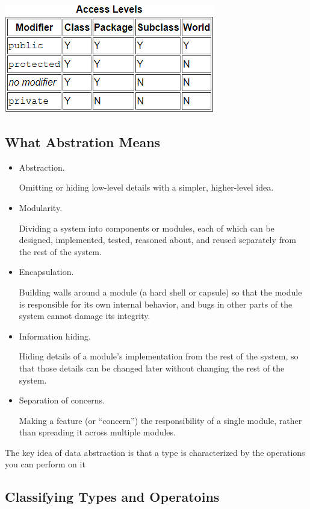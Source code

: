\documentclass[letterpaper,12pt]{article}
\begin{document}
\includegraphics*{./summary_image/Access level control.png}

\subsection{What Abstration Means}

\begin{itemize}
      \item Abstraction.

            Omitting or hiding low-level details with a simpler, higher-level idea.
      \item Modularity.

            Dividing a system into components or modules, each of which can be designed,
            implemented, tested, reasoned about, and reused separately from the rest of the
            system.
      \item Encapsulation.

            Building walls around a module (a hard shell or capsule) so that the module is
            responsible for its own internal behavior, and bugs in other parts of the
            system cannot damage its integrity.
      \item Information hiding.

            Hiding details of a module's implementation from the rest of the system, so
            that those details can be changed later without changing the rest of the
            system.
      \item Separation of concerns.

            Making a feature (or ``concern'') the responsibility of a single module, rather
            than spreading it across multiple modules.
\end{itemize}

The key idea of data abstraction is that a type is characterized by the
operations you can perform on it

\subsection{Classifying Types and Operatoins}
\end{document}
